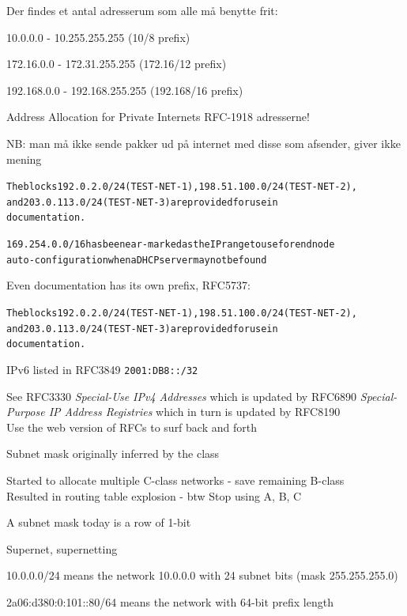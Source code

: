 \documentclass[Screen16to9,17pt]{foils}
\begin{document}
\begin{list1}
\item Der findes et antal adresserum som alle må benytte frit:
\begin{list2}
\item 10.0.0.0    -  10.255.255.255  (10/8 prefix)
\item 172.16.0.0  -  172.31.255.255  (172.16/12 prefix)
\item 192.168.0.0 -  192.168.255.255 (192.168/16 prefix)
\end{list2}
\item Address Allocation for Private Internets RFC-1918 adresserne!
\item NB: man må ikke sende pakker ud på internet med disse som afsender, giver ikke mening
\end{list1}

\begin{alltt}
The blocks 192.0.2.0/24 (TEST-NET-1), 198.51.100.0/24 (TEST-NET-2),
and 203.0.113.0/24 (TEST-NET-3) are provided for use in
documentation.

169.254.0.0/16 has been ear-marked as the IP range to use for end node
auto-configuration when a DHCP server may not be found
\end{alltt}



Even documentation has its own prefix, RFC5737:
\begin{alltt}
The blocks 192.0.2.0/24 (TEST-NET-1), 198.51.100.0/24 (TEST-NET-2),
and 203.0.113.0/24 (TEST-NET-3) are provided for use in
documentation.
\end{alltt}

IPv6 listed in RFC3849 \verb+2001:DB8::/32+

See RFC3330 \emph{Special-Use IPv4 Addresses} which is updated by
RFC6890 \emph{Special-Purpose IP Address Registries} which in turn is updated by RFC8190\\
Use the web version of RFCs to surf back and forth 




\begin{list2}
\item Subnet mask originally inferred by the class
\item Started to allocate multiple C-class networks - save remaining B-class\\
Resulted in routing table explosion - btw Stop using A, B, C
\item A subnet mask today is a row of 1-bit
\item Supernet, supernetting
\item 10.0.0.0/24 means the network 10.0.0.0 with 24 subnet bits (mask 255.255.255.0)
\item 2a06:d380:0:101::80/64 means the network with 64-bit prefix length
\end{list2}
\end{document}
